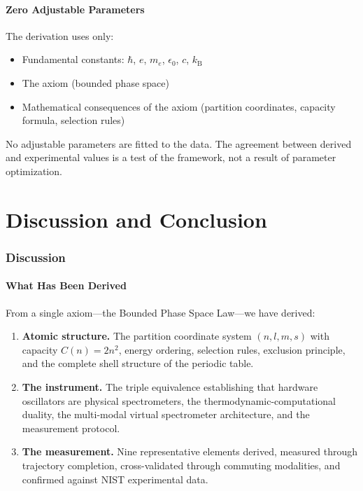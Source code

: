 \documentclass[11pt,a4paper]{article}
\theoremstyle{definition}
\theoremstyle{remark}
\newcommand{\kB}{k_{\mathrm{B}}}
\begin{document}
\subsection{Zero Adjustable Parameters}

The derivation uses only:
\begin{itemize}[nosep]
\item Fundamental constants: $\hbar$, $e$, $m_e$, $\epsilon_0$, $c$, $\kB$
\item The axiom (bounded phase space)
\item Mathematical consequences of the axiom (partition coordinates, capacity formula, selection rules)
\end{itemize}

No adjustable parameters are fitted to the data. The agreement between derived and experimental values is a test of the framework, not a result of parameter optimization.


\part{Discussion and Conclusion}

\section{Discussion}
\label{sec:discussion}

\subsection{What Has Been Derived}

From a single axiom---the Bounded Phase Space Law---we have derived:

\begin{enumerate}
\item \textbf{Atomic structure.} The partition coordinate system $(n, l, m, s)$ with capacity $C(n) = 2n^2$, energy ordering, selection rules, exclusion principle, and the complete shell structure of the periodic table.
\item \textbf{The instrument.} The triple equivalence establishing that hardware oscillators are physical spectrometers, the thermodynamic-computational duality, the multi-modal virtual spectrometer architecture, and the measurement protocol.
\item \textbf{The measurement.} Nine representative elements derived, measured through trajectory completion, cross-validated through commuting modalities, and confirmed against NIST experimental data.
\end{enumerate}
\end{document}
